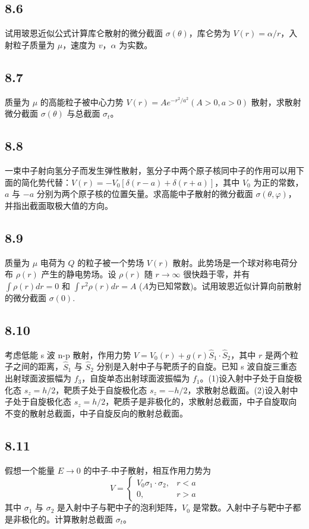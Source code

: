 \subsection{8.6}
试用玻恩近似公式计算库仑散射的微分截面 $\sigma(\theta)$，库仑势为 $V(r)=\alpha/r$，入射粒子质量为 $\mu$，速度为 $v$，$\alpha$ 为实数。

\subsection{8.7}
质量为 $\mu$ 的高能粒子被中心力势 $V(r)=Ae^{-r^2/a^2}(A>0,a>0)$ 散射，求散射微分截面 $\sigma(\theta)$ 与总截面 $\sigma_t$。

\subsection{8.8}
一束中子射向氢分子而发生弹性散射，氢分子中两个原子核同中子的作用可以用下面的简化势代替：$V(r) = -V_{0} \left[ \delta (r-a) + \delta (r+a) \right]$，其中 $V_{0}$ 为正的常数，$a$ 与 $-a$ 分别为两个原子核的位置矢量。求高能中子散射的微分截面 $\sigma(\theta, \varphi)$，并指出截面取极大值的方向。

\subsection{8.9}
质量为 $\mu$ 电荷为 $Q$ 的粒子被一个势场 $V(r)$ 散射。此势场是一个球对称电荷分布 $\rho(r)$ 产生的静电势场。设 $\rho(r)$ 随 $r \to \infty$ 很快趋于零，并有 $\int \rho(r)dr = 0$ 和 $\int r^2 \rho(r)dr = A$ ($A$为已知常数)。试用玻恩近似计算向前散射的微分截面 $\sigma(0)$.

\subsection{8.10}
考虑低能 s 波 n-p 散射，作用力势 $V = V_0(r) + g(r) \hat{S}_1 \cdot \hat{S}_2$，其中 $r$ 是两个粒子之间的距离，$\hat{S}_1$ 与 $\hat{S}_2$ 分别是入射中子与靶质子的自旋。已知 s 波自旋三重态出射球面波振幅为 $f_3$，自旋单态出射球面波振幅为 $f_1$。(1)设入射中子处于自旋极化态 $s_z = h/2$，靶质子处于自旋极化态 $s_z = -h/2$，求散射总截面。(2)设入射中子处于自旋极化态 $s_z = h/2$，靶质子是非极化的，求散射总截面，中子自旋取向不变的散射总截面，中子自旋反向的散射总截面。

\subsection{8.11}
假想一个能量 $E \to 0$ 的中子-中子散射，相互作用力势为
$$V = 
\begin{cases}
V_0 \sigma_1 \cdot \sigma_2, & r < a \\
0, & r > a
\end{cases}$$
其中 $\sigma_1$ 与 $\sigma_2$ 是入射中子与靶中子的泡利矩阵，$V_0$ 是常数。入射中子与靶中子都是非极化的。计算散射总截面 $\sigma_t$。

